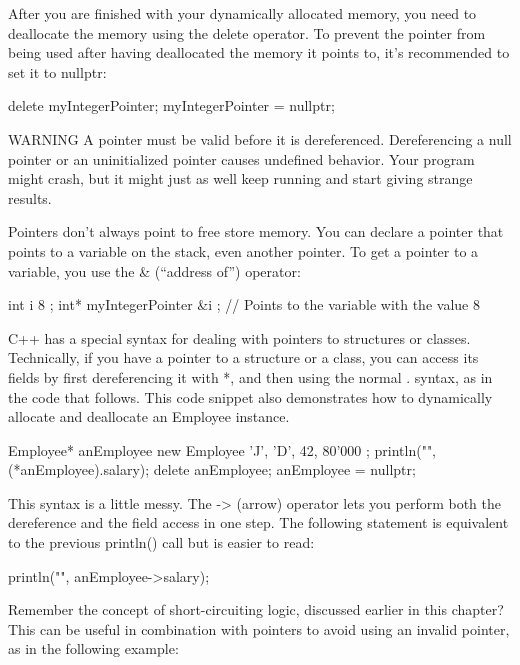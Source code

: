 After you are finished with your dynamically allocated memory, you need to deallocate the memory using the delete operator. To prevent the pointer from being used after having deallocated the memory it points to, it’s recommended to set it to nullptr:

\begin{cpp}
delete myIntegerPointer;
myIntegerPointer = nullptr;
\end{cpp}

\begin{myWarning}{WARNING}
A pointer must be valid before it is dereferenced. Dereferencing a null pointer or an uninitialized pointer causes undefined behavior. Your program might crash, but it might just as well keep running and start giving strange results.
\end{myWarning}

Pointers don’t always point to free store memory. You can declare a pointer that points to a variable on the stack, even another pointer. To get a pointer to a variable, you use the \& (“address of”) operator:

\begin{cpp}
int i { 8 };
int* myIntegerPointer { &i }; // Points to the variable with the value 8
\end{cpp}

C++ has a special syntax for dealing with pointers to structures or classes. Technically, if you have a pointer to a structure or a class, you can access its fields by first dereferencing it with *, and then using the normal . syntax, as in the code that follows. This code snippet also demonstrates how to dynamically allocate and deallocate an Employee instance.

\begin{cpp}
Employee* anEmployee { new Employee { 'J', 'D', 42, 80'000 } };
println("{}", (*anEmployee).salary);
delete anEmployee; anEmployee = nullptr;
\end{cpp}

This syntax is a little messy. The -> (arrow) operator lets you perform both the dereference and the field access in one step. The following statement is equivalent to the previous println() call but is easier to read:

\begin{cpp}
println("{}", anEmployee->salary);
\end{cpp}

Remember the concept of short-circuiting logic, discussed earlier in this chapter? This can be useful in combination with pointers to avoid using an invalid pointer, as in the following example:

